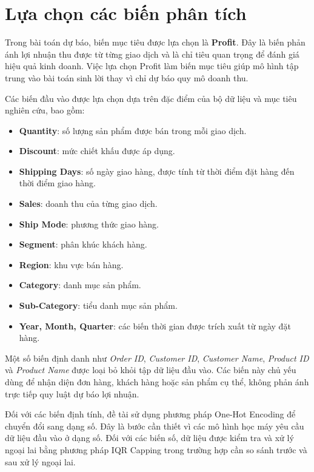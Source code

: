 \section{Lựa chọn các biến phân tích}

Trong bài toán dự báo, biến mục tiêu được lựa chọn là \textbf{Profit}. Đây là biến phản ánh lợi nhuận thu được từ từng giao dịch và là chỉ tiêu quan trọng để đánh giá hiệu quả kinh doanh. Việc lựa chọn Profit làm biến mục tiêu giúp mô hình tập trung vào bài toán sinh lời thay vì chỉ dự báo quy mô doanh thu.

Các biến đầu vào được lựa chọn dựa trên đặc điểm của bộ dữ liệu và mục tiêu nghiên cứu, bao gồm:
\begin{itemize}
    \item \textbf{Quantity}: số lượng sản phẩm được bán trong mỗi giao dịch.
    \item \textbf{Discount}: mức chiết khấu được áp dụng.
    \item \textbf{Shipping Days}: số ngày giao hàng, được tính từ thời điểm đặt hàng đến thời điểm giao hàng.
    \item \textbf{Sales}: doanh thu của từng giao dịch.
    \item \textbf{Ship Mode}: phương thức giao hàng.
    \item \textbf{Segment}: phân khúc khách hàng.
    \item \textbf{Region}: khu vực bán hàng.
    \item \textbf{Category}: danh mục sản phẩm.
    \item \textbf{Sub-Category}: tiểu danh mục sản phẩm.
    \item \textbf{Year, Month, Quarter}: các biến thời gian được trích xuất từ ngày đặt hàng.
\end{itemize}

Một số biến định danh như \textit{Order ID}, \textit{Customer ID}, \textit{Customer Name}, \textit{Product ID} và \textit{Product Name} được loại bỏ khỏi tập dữ liệu đầu vào. Các biến này chủ yếu dùng để nhận diện đơn hàng, khách hàng hoặc sản phẩm cụ thể, không phản ánh trực tiếp quy luật dự báo lợi nhuận.

Đối với các biến định tính, đề tài sử dụng phương pháp One-Hot Encoding để chuyển đổi sang dạng số. Đây là bước cần thiết vì các mô hình học máy yêu cầu dữ liệu đầu vào ở dạng số. Đối với các biến số, dữ liệu được kiểm tra và xử lý ngoại lai bằng phương pháp IQR Capping trong trường hợp cần so sánh trước và sau xử lý ngoại lai.

